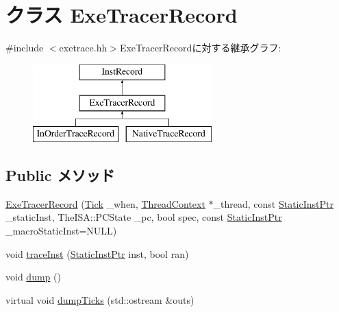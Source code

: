 \hypertarget{classTrace_1_1ExeTracerRecord}{
\section{クラス ExeTracerRecord}
\label{classTrace_1_1ExeTracerRecord}
}


{\ttfamily \#include $<$exetrace.hh$>$}ExeTracerRecordに対する継承グラフ:\begin{figure}[H]
\begin{center}
\leavevmode
\includegraphics[height=3cm]{classTrace_1_1ExeTracerRecord}
\end{center}
\end{figure}
\subsection*{Public メソッド}
\begin{DoxyCompactItemize}
\item 
\hyperlink{classTrace_1_1ExeTracerRecord_a844c9c850d68ee8d85ea92d32d0adab7}{ExeTracerRecord} (\hyperlink{base_2types_8hh_a5c8ed81b7d238c9083e1037ba6d61643}{Tick} \_\-when, \hyperlink{classThreadContext}{ThreadContext} $\ast$\_\-thread, const \hyperlink{classRefCountingPtr}{StaticInstPtr} \_\-staticInst, TheISA::PCState \_\-pc, bool spec, const \hyperlink{classRefCountingPtr}{StaticInstPtr} \_\-macroStaticInst=NULL)
\item 
void \hyperlink{classTrace_1_1ExeTracerRecord_a82b1db57da6b03b92f9e8836e93256ef}{traceInst} (\hyperlink{classRefCountingPtr}{StaticInstPtr} inst, bool ran)
\item 
void \hyperlink{classTrace_1_1ExeTracerRecord_accd2600060dbaee3a3b41aed4034c63c}{dump} ()
\item 
virtual void \hyperlink{classTrace_1_1ExeTracerRecord_aef89645ab69fe4a5a6d76dd3439ad417}{dumpTicks} (std::ostream \&outs)
\end{DoxyCompactItemize}



